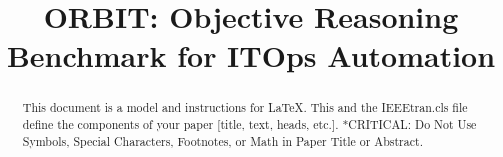 \documentclass[conference]{IEEEtran}
\begin{document}
\title{ORBIT: Objective Reasoning Benchmark for ITOps Automation
}


\maketitle

\begin{abstract}
This document is a model and instructions for \LaTeX.
This and the IEEEtran.cls file define the components of your paper [title, text, heads, etc.]. *CRITICAL: Do Not Use Symbols, Special Characters, Footnotes, 
or Math in Paper Title or Abstract.
\end{abstract}
\end{document}
